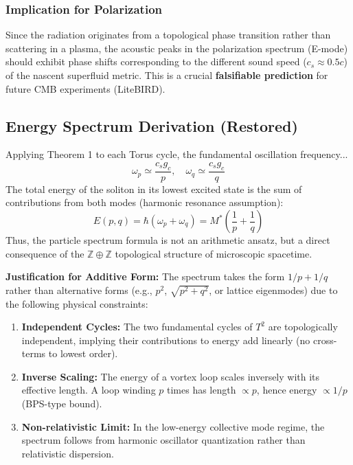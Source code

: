 \documentclass[a4paper,12pt]{article}
\begin{document}
\subsubsection{Implication for Polarization}
Since the radiation originates from a topological phase transition rather than scattering in a plasma, the acoustic peaks in the polarization spectrum (E-mode) should exhibit phase shifts corresponding to the different sound speed ($c_s \approx 0.5c$) of the nascent superfluid metric. This is a crucial \textbf{falsifiable prediction} for future CMB experiments (LiteBIRD).

\subsection{Energy Spectrum Derivation (Restored)}
Applying Theorem 1 to each Torus cycle, the fundamental oscillation frequency...
\begin{equation}
 \omega_p \simeq \frac{c_s g_c}{p}, \quad \omega_q \simeq \frac{c_s g_c}{q}
\end{equation}
The total energy of the soliton in its lowest excited state is the sum of contributions from both modes (harmonic resonance assumption):
\begin{equation}
 E(p,q) = \hbar (\omega_p + \omega_q) = M^* \left( \frac{1}{p} + \frac{1}{q} \right)
\end{equation}
Thus, the particle spectrum formula is not an arithmetic ansatz, but a direct consequence of the $\mathbb{Z} \oplus \mathbb{Z}$ topological structure of microscopic spacetime.

\textbf{Justification for Additive Form:}
The spectrum takes the form $1/p + 1/q$ rather than alternative forms (e.g., $p^2$, $\sqrt{p^2+q^2}$, or lattice eigenmodes) due to the following physical constraints:
\begin{enumerate}
\item \textbf{Independent Cycles:} The two fundamental cycles of $T^2$ are topologically independent, implying their contributions to energy add linearly (no cross-terms to lowest order).
\item \textbf{Inverse Scaling:} The energy of a vortex loop scales inversely with its effective length. A loop winding $p$ times has length $\propto p$, hence energy $\propto 1/p$ (BPS-type bound).
\item \textbf{Non-relativistic Limit:} In the low-energy collective mode regime, the spectrum follows from harmonic oscillator quantization rather than relativistic dispersion.
\end{enumerate}
\end{document}
